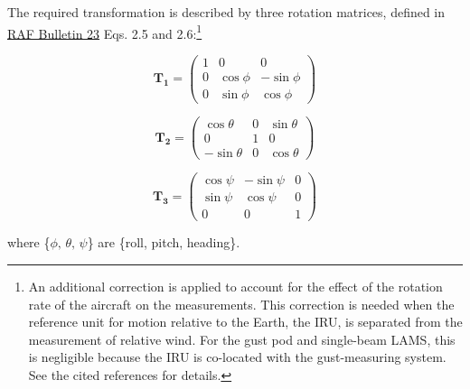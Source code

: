 \documentclass[12pt,twoside,english]{article}\usepackage[]{graphicx}\usepackage[]{color}
\let\OrgIndex\index
\renewcommand*{\index}[1]{\OrgIndex{#1}}
\begin{document}
The required transformation is described by three rotation matrices, defined in \href{https://www.eol.ucar.edu/raf/Bulletins/bulletin23.html}{RAF Bulletin 23} Eqs. 2.5 and 2.6:\footnote{An additional correction is applied to account for the effect of the rotation rate of the aircraft on the measurements. This correction is needed when the reference unit for motion relative to the Earth, the IRU, is separated from the measurement of relative wind. For the gust pod and single-beam LAMS, this is negligible because the IRU is co-located with the gust-measuring system. See the cited references for details.} 

\[
\mathbf{T_{1}}=\left(\begin{array}{ccc}
1 & 0 & 0\\ 0 & \cos\phi & -\sin\phi\\ 0 & \sin\phi & \cos\phi 
\end{array}\right) 
\]


\begin{equation}
\mathbf{T_{2}}=\left(\begin{array}{ccc}
\cos\theta & 0 & \sin\theta\\ 0 & 1 & 0\\ -\sin\theta & 0 & \cos\theta 
\end{array}\right)\label{eq:rotation-matrices}
\end{equation}


\[
\mathbf{T_{3}}=\left(\begin{array}{ccc}
\cos\psi & -\sin\psi & 0\\ 
\sin\psi & \cos\psi & 0\\ 0 & 0 & 1 
\end{array}\right) 
\]


where \{$\phi,\,\theta,\,\psi$\} are \{roll, pitch, heading\}. 
\end{document}
